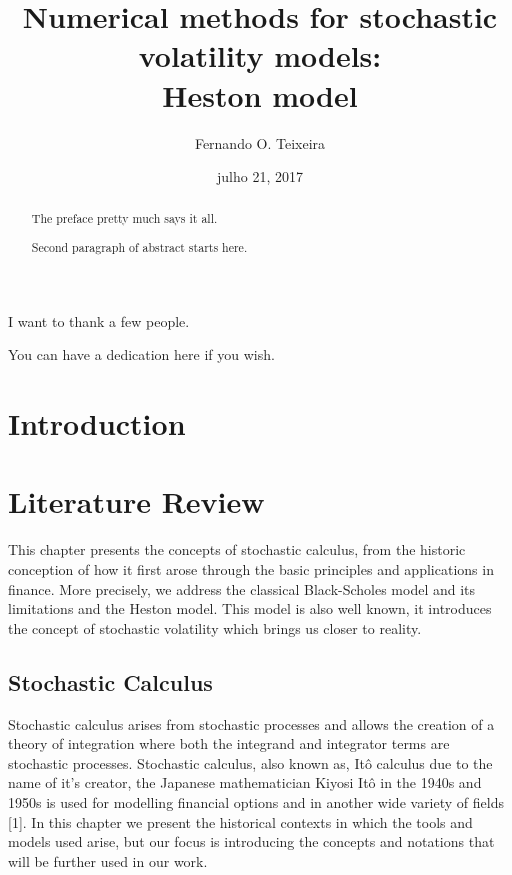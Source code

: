 \documentclass[12pt,twoside]{reedthesis}
\title{\textbf{\Huge{Numerical methods for stochastic volatility models: \\[20pt] Heston model}}}
\author{Fernando O. Teixeira}
\date{julho 21, 2017}
\theoremstyle{definition}
\theoremstyle{definition}
\theoremstyle{remark}
\begin{document}
      \maketitle
  
  \frontmatter %
  \pagestyle{empty} %
      \begin{acknowledgements}
      I want to thank a few people.
    \end{acknowledgements}
  
      \hypersetup{linkcolor=black}
    \setcounter{tocdepth}{2}
    \tableofcontents
  
      \listoftables
  
      \listoffigures
      \begin{abstract}
      The preface pretty much says it all. \par  Second paragraph of abstract
      starts here.
    \end{abstract}
      \begin{dedication}
      You can have a dedication here if you wish.
    \end{dedication}
  \mainmatter %
  \pagestyle{fancyplain} %

  \chapter{Introduction}\label{intro}
  
  \chapter{Literature Review}\label{lt-review}
  
  This chapter presents the concepts of stochastic calculus, from the
  historic conception of how it first arose through the basic principles
  and applications in finance. More precisely, we address the classical
  Black-Scholes model and its limitations and the Heston model. This model
  is also well known, it introduces the concept of stochastic volatility
  which brings us closer to reality.
  
  \section{Stochastic Calculus}\label{stochastic-calculus}
  
  Stochastic calculus arises from stochastic processes and allows the
  creation of a theory of integration where both the integrand and
  integrator terms are stochastic processes. Stochastic calculus, also
  known as, Itô calculus due to the name of it's creator, the Japanese
  mathematician Kiyosi Itô in the 1940s and 1950s is used for modelling
  financial options and in another wide variety of fields {[}1{]}. In this
  chapter we present the historical contexts in which the tools and models
  used arise, but our focus is introducing the concepts and notations that
  will be further used in our work.
  
\end{document}
